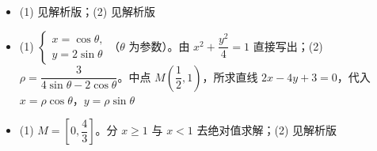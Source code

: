 \begin{itemize}[leftmargin=2.6em]
  \item[\textbf{22.}] (1) 见解析版；(2) 见解析版
  \item[\textbf{23.}] (1) $\begin{cases}x=\cos\theta,\\y=2\sin\theta\end{cases}$（$\theta$ 为参数）。由 $x^2+\dfrac{y^2}4=1$ 直接写出；(2) $\rho=\dfrac3{4\sin\theta-2\cos\theta}$。中点 $M\left(\dfrac12,1\right)$，所求直线 $2x-4y+3=0$，代入 $x=\rho\cos\theta$，$y=\rho\sin\theta$
  \item[\textbf{24.}] (1) $M=\left[0,\dfrac43\right]$。分 $x\geqslant1$ 与 $x<1$ 去绝对值求解；(2) 见解析版
\end{itemize}
